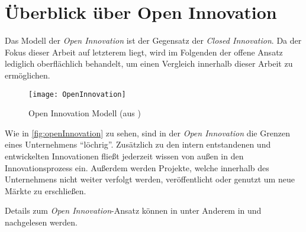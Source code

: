 \section{Überblick über Open Innovation}\label{sec:grundlagen-open}

Das Modell der \textit{Open Innovation} ist der Gegensatz der \textit{Closed Innovation}.
Da der Fokus dieser Arbeit auf letzterem liegt,
wird im Folgenden der offene Ansatz lediglich oberflächlich behandelt,
um einen Vergleich innerhalb dieser Arbeit zu ermöglichen.

\begin{figure}[ht!]
    \centering
    \texttt{[image: OpenInnovation]}
    \caption{Open Innovation Modell (aus \cite[23]{herzog2011})}
    \label{fig:openInnovation}
\end{figure}

Wie in \autoref{fig:openInnovation} zu sehen,
sind in der \textit{Open Innovation} die Grenzen eines Unternehmens \enquote{löchrig}.
Zusätzlich zu den intern entstandenen und entwickelten Innovationen
fließt jederzeit wissen von außen in den Innovationsprozess ein.
Außerdem werden Projekte, welche innerhalb des Unternehmens nicht weiter verfolgt werden,
veröffentlicht oder genutzt um neue Märkte zu erschließen.

Details zum \textit{Open Innovation}-Ansatz können in unter Anderem
in \cite[60\psqq]{chesbrough2003} und \cite[21\psqq]{herzog2011} nachgelesen werden.